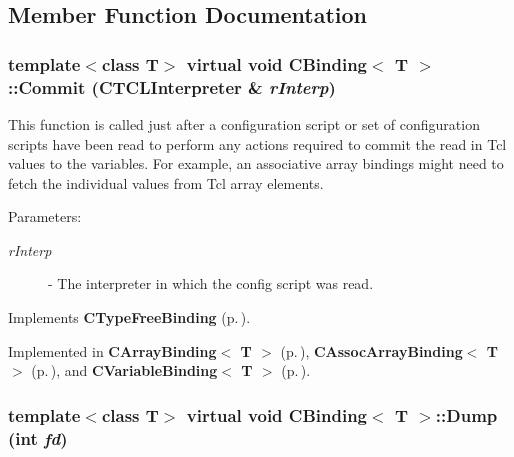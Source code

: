 \subsection{Member Function Documentation}
\subsubsection{\setlength{\rightskip}{0pt plus 5cm}template$<$class T$>$ virtual void CBinding$<$ T $>$::Commit ({\bf CTCLInterpreter} \& {\em r\-Interp})\hspace{0.3cm}{\tt  [pure virtual]}}\label{classCBinding_a1}


This function is called just after a configuration script or set of  configuration scripts have been read to perform any actions required to commit the read in Tcl values to the variables. For example, an associative array bindings might need to fetch the individual values from Tcl array elements. \begin{Desc}
\item[Parameters: ]\par
\begin{description}
\item[{\em 
r\-Interp}]- The interpreter in which the config script was read. \end{description}
\end{Desc}


Implements {\bf CType\-Free\-Binding} {\rm (p.\,\pageref{classCTypeFreeBinding_a1})}.

Implemented in {\bf CArray\-Binding$<$ T $>$} {\rm (p.\,\pageref{classCArrayBinding_a11})}, {\bf CAssoc\-Array\-Binding$<$ T $>$} {\rm (p.\,\pageref{classCAssocArrayBinding_a13})}, and {\bf CVariable\-Binding$<$ T $>$} {\rm (p.\,\pageref{classCVariableBinding_a14})}.
\subsubsection{\setlength{\rightskip}{0pt plus 5cm}template$<$class T$>$ virtual void CBinding$<$ T $>$::Dump (int {\em fd})\hspace{0.3cm}{\tt  [pure virtual]}}\label{classCBinding_a2}


